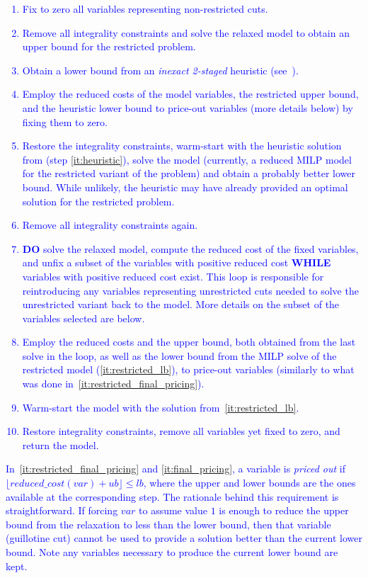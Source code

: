 \documentclass[smallextended]{svjour3}       %
\newif\iffinalversion
\newcommand{\newtext}[1]{\iffinalversion%
#1%
\else%
\textcolor{blue}{#1}%
\fi%
}
\begin{document}
\newtext{
\begin{enumerate}
\item Fix to zero all variables representing non-restricted cuts.
\item Remove all integrality constraints and solve the relaxed model to obtain an upper bound for the restricted problem.
\item Obtain a lower bound from an \emph{inexact 2-staged} heuristic (see~\cite{furini:2016,dolatabadi:2012}).\label{it:heuristic}
\item Employ the reduced costs of the model variables, the restricted upper bound, and the heuristic lower bound to price-out variables (more details below) by fixing them to zero.\label{it:restricted_final_pricing}
\item Restore the integrality constraints, warm-start with the heuristic solution from (step \autoref{it:heuristic}), solve the model (currently, a reduced MILP model for the restricted variant of the problem) and obtain a probably better lower bound. While unlikely, the heuristic may have already provided an optimal solution for the restricted problem.\label{it:restricted_lb}
\item Remove all integrality constraints again.
\item \textbf{DO} solve the relaxed model, compute the reduced cost of the fixed variables, and unfix a subset of the variables with positive reduced cost \textbf{WHILE} variables with positive reduced cost exist. This loop is responsible for reintroducing any variables representing unrestricted cuts needed to solve the unrestricted variant back to the model. More details on the subset of the variables selected are below.\label{it:loop}
\item Employ the reduced costs and the upper bound, both obtained from the last solve in the loop, as well as the lower bound from the MILP solve of the restricted model (\autoref{it:restricted_lb}), to price-out variables (similarly to what was done in~\autoref{it:restricted_final_pricing}).\label{it:final_pricing}
\item Warm-start the model with the solution from~\autoref{it:restricted_lb}.
\item Restore integrality constraints, remove all variables yet fixed to zero, and return the model.
\end{enumerate}
}

\newtext{
In~\autoref{it:restricted_final_pricing} and \autoref{it:final_pricing}, a variable is \emph{priced out} if \(\lfloor reduced\_cost(var) + ub \rfloor \leq lb\), where the upper and lower bounds are the ones available at the corresponding step. The rationale behind this requirement is straightforward. If forcing \(var\) to assume value \(1\) is enough to reduce the upper bound from the relaxation to less than the lower bound, then that variable (guillotine cut) cannot be used to provide a solution better than the current lower bound. Note any variables necessary to produce the current lower bound are kept.
}
\end{document}
